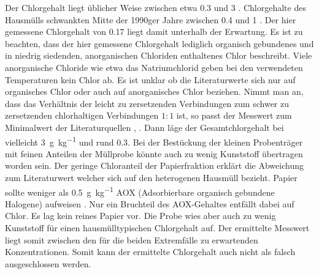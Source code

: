 Der Chlorgehalt liegt üblicher Weise zwischen etwa \SI{0,3}{\mpercent} und \SI{3}{\mpercent}  \cite{LLA_Abfallanalyse}. Chlorgehalte des Hausmülls schwankten Mitte der 1990ger Jahre zwischen \SI{0,4}{\mpercent} und \SI{1}{\mpercent} \cite[S.22, Tab. 2.1]{scholz2013}. Der hier gemessene Chlorgehalt von \SI{0,17}{\mpercent} liegt damit unterhalb der Erwartung. Es ist zu beachten, dass der hier gemessene Chlorgehalt lediglich organisch gebundenes und in niedrig siedenden, anorganischen Chloriden enthaltenes Chlor beschreibt. Viele anorganische Chloride wie etwa das Natriumchlorid geben bei den verwendeten Temperaturen kein Chlor ab. Es ist unklar ob die Literaturwerte sich nur auf organisches Chlor oder auch auf anorganisches Chlor beziehen. Nimmt man an, dass das Verhältnis der leicht zu zersetzenden Verbindungen zum schwer zu zersetzenden chlorhaltigen Verbindungen $1:1$ ist, so passt der Messwert zum Minimalwert der Literaturquellen \cite{LLA_Abfallanalyse}, \cite{scholz2013}. Dann läge der Gesamtchlorgehalt bei vielleicht \SI{3}{\gram\per\kilogram} und rund \SI{0,3}{\mpercent}. Bei der Bestückung der kleinen Probenträger mit feinen Anteilen der Müllprobe könnte auch zu wenig Kunststoff übertragen worden sein. Der geringe Chloranteil der Papierfraktion erklärt die Abweichung zum Literaturwert welcher sich auf den heterogenen Hausmüll bezieht. Papier sollte weniger als \SI{0,5}{\gram\per\kilogram} AOX (Adsorbierbare organisch gebundene Halogene) aufweisen \cite{lexikon}. Nur ein Bruchteil des AOX-Gehaltes entfällt dabei auf Chlor. Es lag kein reines Papier vor. Die Probe wies aber auch zu wenig Kunststoff für einen hausmülltypischen Chlorgehalt auf. Der ermittelte Messwert liegt somit zwischen den für die beiden Extremfälle zu erwartenden Konzentrationen. Somit kann der ermittelte Chlorgehalt auch nicht als falsch ausgeschlossen werden.


